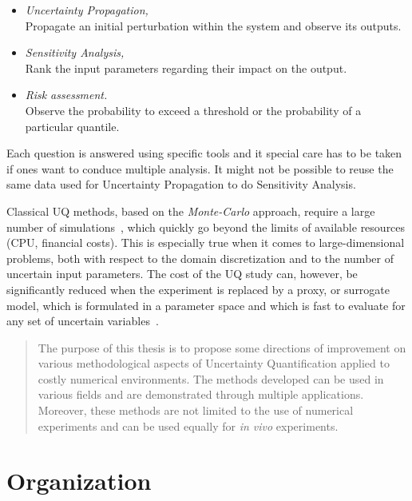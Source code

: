 \begin{itemize}
	\item \emph{Uncertainty Propagation,}\hfill\\
Propagate an initial perturbation within the system and observe its outputs.
	\item \emph{Sensitivity Analysis,}\hfill\\
Rank the input parameters regarding their impact on the output.
	\item \emph{Risk assessment.}\hfill\\
Observe the probability to exceed a threshold or the probability of a particular quantile.
\end{itemize}

Each question is answered using specific tools and it special care has to be taken if ones want to conduce multiple analysis. It might not be possible to reuse the same data used for Uncertainty Propagation to do Sensitivity Analysis.

Classical UQ methods, based on the \emph{Monte-Carlo} approach, require a large number of simulations~\cite{saltelli2007}, which quickly go beyond the limits of available resources (CPU, financial costs). This is especially true when it comes to large-dimensional problems, both with respect to the domain discretization and to the number of uncertain input parameters. The cost of the UQ study can, however, be significantly reduced when the experiment is replaced by a proxy, or surrogate model, which is formulated in a parameter space and which is fast to evaluate for any set of uncertain variables~\cite{martin2005}. 

\begin{quotation}

{\selectfont

The purpose of this thesis is to propose some directions of improvement on various methodological aspects of Uncertainty Quantification applied to costly numerical environments. The methods developed can be used in various fields and are demonstrated through multiple applications. Moreover, these methods are not limited to the use of numerical experiments and can be used equally for \emph{in vivo} experiments.

}
\end{quotation}

\newpage

\section*{Organization}

